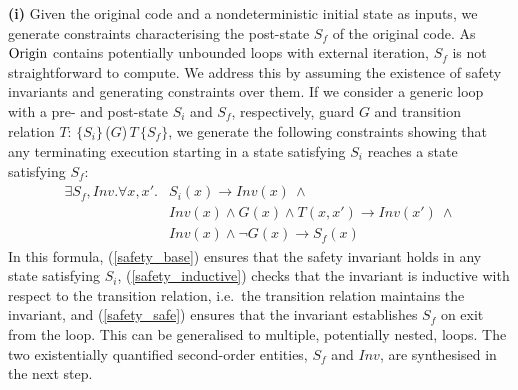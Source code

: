 \documentclass[runningheads,a4paper]{llncs}
\begin{document}
{\bf(i)} Given the original code and a nondeterministic initial state as inputs, 
we generate constraints characterising the post-state $S_f$ of the original code.
%
%
As $\code{Origin}$ contains potentially unbounded loops with external
iteration, $S_f$ is not straightforward to compute. We address this by
assuming the existence of safety invariants and generating constraints
over them.  If we consider a generic loop with a pre- and post-state
$S_i$ and $S_f$, respectively, guard $G$ and transition relation $T$:
$\{\mathit{S_i}\}$\,($G$)\,$T$\,$\{\mathit{S_f}\}$,
%
we generate the following constraints showing that
any terminating
execution starting in a state satisfying $\mathit{S_i}$ reaches a
state satisfying $\mathit{S_f}:$
%
{\small
\begin{align}
  \exists S_f, Inv. \forall x, x' .  & \mathit{S_i(x)} \rightarrow Inv(x) ~ \wedge \label{safety_base}\\
  & Inv(x) \wedge G(x) \wedge T(x, x') \rightarrow \mathit{Inv}(x') ~ \wedge \label{safety_inductive}\\
  & Inv(x) \wedge \neg G(x) \rightarrow \mathit{S_f(x)} \label{safety_safe}
\end{align}
}
In this formula, (\ref{safety_base}) ensures that the safety invariant holds
in any state satisfying $S_i$, (\ref{safety_inductive}) checks that the invariant is
inductive with respect to the transition relation, i.e.~the transition
relation maintains the invariant, and (\ref{safety_safe}) ensures that the
invariant establishes $S_f$ on exit from the loop.  This can be
generalised to multiple, potentially nested, loops.
%
%
The two existentially quantified second-order entities, $S_f$ and $Inv$, are synthesised
in the next step.
\end{document}
